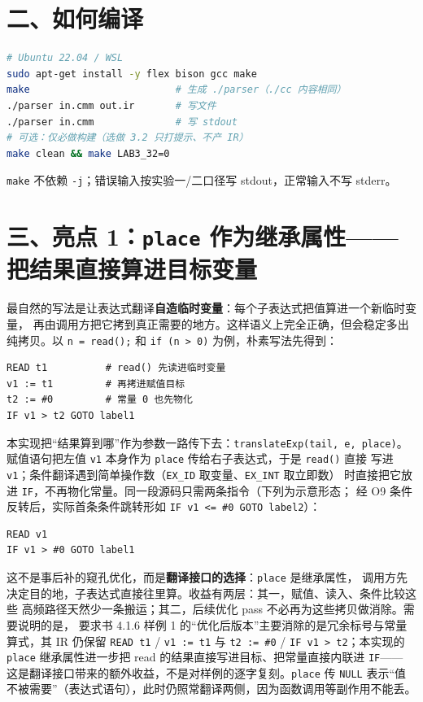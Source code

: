 \documentclass[11pt,a4paper]{ctexart}
\newcommand{\code}[1]{\texttt{#1}}
\begin{document}
\section*{二、如何编译}

\begin{lstlisting}[language=bash]
# Ubuntu 22.04 / WSL
sudo apt-get install -y flex bison gcc make
make                         # 生成 ./parser（./cc 内容相同）
./parser in.cmm out.ir       # 写文件
./parser in.cmm              # 写 stdout
# 可选：仅必做构建（选做 3.2 只打提示、不产 IR）
make clean && make LAB3_32=0
\end{lstlisting}

\code{make} 不依赖 \code{-j}；错误输入按实验一/二口径写 stdout，正常输入不写 stderr。

\section*{三、亮点 1：\code{place} 作为继承属性——把结果直接算进目标变量}

最自然的写法是让表达式翻译\textbf{自造临时变量}：每个子表达式把值算进一个新临时变量，
再由调用方把它拷到真正需要的地方。这样语义上完全正确，但会稳定多出纯拷贝。以
\code{n = read();} 和 \code{if (n > 0)} 为例，朴素写法先得到：

\begin{lstlisting}
READ t1          # read() 先读进临时变量
v1 := t1         # 再拷进赋值目标
t2 := #0         # 常量 0 也先物化
IF v1 > t2 GOTO label1
\end{lstlisting}

本实现把“结果算到哪”作为参数一路传下去：\code{translateExp(tail, e, place)}。
赋值语句把左值 \code{v1} 本身作为 \code{place} 传给右子表达式，于是 \code{read()} 直接
写进 \code{v1}；条件翻译遇到简单操作数（\code{EX\_ID} 取变量、\code{EX\_INT} 取立即数）
时直接把它放进 \code{IF}，不再物化常量。同一段源码只需两条指令（下列为示意形态；
经 O9 条件反转后，实际首条条件跳转形如 \code{IF v1 <= \#0 GOTO label2}）：

\begin{lstlisting}
READ v1
IF v1 > #0 GOTO label1
\end{lstlisting}

这不是事后补的窥孔优化，而是\textbf{翻译接口的选择}：\code{place} 是继承属性，
调用方先决定目的地，子表达式直接往里算。收益有两层：其一，赋值、读入、条件比较这些
高频路径天然少一条搬运；其二，后续优化 pass 不必再为这些拷贝做消除。需要说明的是，
要求书 4.1.6 样例 1 的“优化后版本”主要消除的是冗余标号与常量算式，其 IR 仍保留
\code{READ t1} / \code{v1 := t1} 与 \code{t2 := \#0} / \code{IF v1 > t2}；本实现的
\code{place} 继承属性进一步把 read 的结果直接写进目标、把常量直接内联进 \code{IF}——
这是翻译接口带来的额外收益，不是对样例的逐字复刻。\code{place} 传 \code{NULL}
表示“值不被需要”（表达式语句），此时仍照常翻译两侧，因为函数调用等副作用不能丢。
\end{document}
